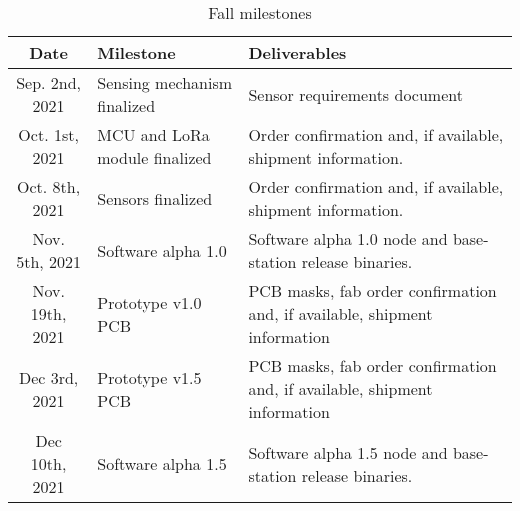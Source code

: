 \begin{table}[H]
    \begin{tabularx}{\linewidth}{|c|X|X|}
        \hline
        Date & Milestone & Deliverables \\
        \hline\hline
        Sep. 2nd, 2021 
        & Sensing mechanism finalized 
        & Sensor requirements document \\
        
        \hline
        Oct. 1st, 2021
        & MCU and LoRa module finalized
        & Order confirmation and, if available, shipment information. \\
        
        \hline
        Oct. 8th, 2021 
        & Sensors finalized 
        & Order confirmation and, if available, shipment information. \\
        
        \hline
        Nov. 5th, 2021 
        & Software alpha 1.0 
        & Software alpha 1.0 node and base-station release binaries. \\ 
        
        \hline
        Nov. 19th, 2021 & Prototype v1.0 PCB 
        & PCB masks, fab order confirmation and, if available, shipment information \\
        
        \hline
        Dec 3rd, 2021 & Prototype v1.5 PCB 
        & PCB masks, fab order confirmation and, if available, shipment information \\
        
        \hline
        Dec 10th, 2021 
        & Software alpha 1.5 
        & Software alpha 1.5 node and base-station release binaries. \\ 
        
        \hline
    \end{tabularx}
    \caption{Fall milestones}
\end{table}

